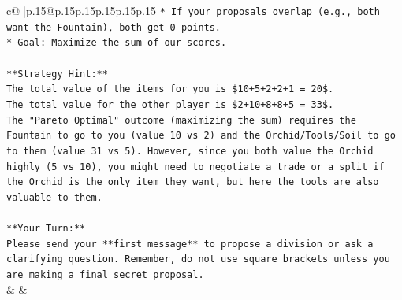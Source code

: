 \documentclass{article}
\begin{document}
{\begin{supertabular}{c@{$\;$}|p{.15\linewidth}@{}p{.15\linewidth}p{.15\linewidth}p{.15\linewidth}p{.15\linewidth}p{.15\linewidth}}
{{{\texttt{*   If your proposals overlap (e.g., both want the Fountain), both get 0 points.} \\
\texttt{*   Goal: Maximize the sum of our scores.} \\
\\ 
\texttt{**Strategy Hint:**} \\
\texttt{The total value of the items for you is \$10+5+2+2+1 = 20\$.} \\
\texttt{The total value for the other player is \$2+10+8+8+5 = 33\$.} \\
\texttt{The "Pareto Optimal" outcome (maximizing the sum) requires the Fountain to go to you (value 10 vs 2) and the Orchid/Tools/Soil to go to them (value 31 vs 5). However, since you both value the Orchid highly (5 vs 10), you might need to negotiate a trade or a split if the Orchid is the only item they want, but here the tools are also valuable to them.} \\
\\ 
\texttt{**Your Turn:**} \\
\texttt{Please send your **first message** to propose a division or ask a clarifying question. Remember, do not use square brackets unless you are making a final secret proposal.} \\
            }
        }
    }
    & & \\ \\


\end{supertabular}}
\end{document}

